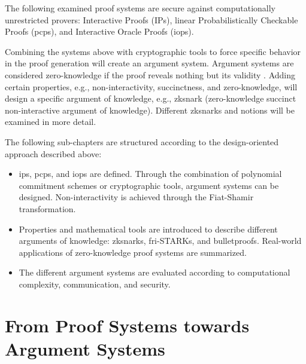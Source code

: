 The following examined proof systems are secure against computationally unrestricted provers: Interactive Proofs (IPs), linear Probabilistically Checkable Proofs (\acrshort{pcp}s), and Interactive Oracle Proofs (\acrshort{iop}s). 

Combining the systems above with cryptographic tools to force specific behavior in the proof generation will create an argument system. Argument systems are considered zero-knowledge if the proof reveals nothing but its validity \citep{GoldwasserIPs}. Adding certain properties, e.g., non-interactivity, succinctness, and zero-knowledge, will design a specific argument of knowledge, e.g., \acrshort{zksnark} (zero-knowledge succinct non-interactive argument of knowledge). Different \acrshort{zksnark}s and notions will be examined in more detail.

The following sub-chapters are structured according to the design-oriented approach described above:
\begin{itemize}
    \item \acrshort{ip}s, \acrshort{pcp}s, and \acrshort{iop}s are defined. Through the combination of polynomial commitment schemes or cryptographic tools, argument systems can be designed. Non-interactivity is achieved through the Fiat-Shamir transformation.
    \item Properties and mathematical tools are introduced to describe different arguments of knowledge: \acrshort{zksnark}s, \acrshort{fri}-STARKs, and bulletproofs. Real-world applications of zero-knowledge proof systems are summarized.
    \item The different argument systems are evaluated according to computational complexity, communication, and security.
\end{itemize}

\section{From Proof Systems towards Argument Systems}

